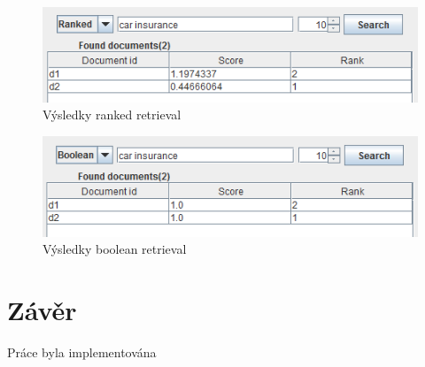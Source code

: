 \documentclass[11pt,a4paper]{scrartcl}
\begin{document}
	\begin{figure}[h]
		\centering
		\includegraphics[width=\linewidth]{gui-ranked-res}
		\caption{Výsledky ranked retrieval}
		\label{fig:ranked}
	\end{figure}

	\begin{figure}[h]
		\centering
		\includegraphics[width=\linewidth]{gui-boolean-res}
		\caption{Výsledky boolean retrieval}
		\label{fig:boolean}
	\end{figure}
	
	\section{Závěr}
	
	Práce byla implementována
	
\end{document}
